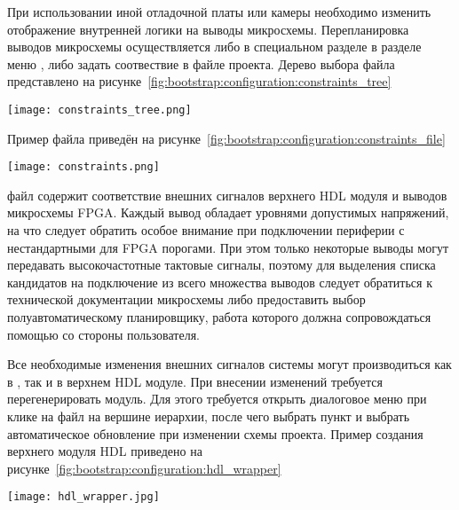 При использовании иной отладочной платы или камеры необходимо изменить отображение внутренней
логики на выводы микросхемы. Перепланировка выводов микросхемы осуществляется либо в специальном
разделе  в разделе меню , либо задать соотвествие в 
файле проекта. Дерево выбора  файла представлено на рисунке~\ref{fig:bootstrap:configuration:constraints_tree}

\begin{center}
  \centering
  \texttt{[image: constraints\_tree.png]}
  \label{fig:bootstrap:configuration:constraints_tree}
\end{center}

Пример  файла приведён на рисунке~\ref{fig:bootstrap:configuration:constraints_file}

\begin{center}
  \centering
  \texttt{[image: constraints.png]}
  \label{fig:bootstrap:configuration:constraints_file}
\end{center}

 файл содержит соответствие внешних сигналов верхнего HDL модуля и
выводов микросхемы FPGA. Каждый вывод обладает уровнями допустимых напряжений, на что
следует обратить особое внимание при подключении периферии с нестандартными для FPGA
порогами. При этом только некоторые выводы могут передавать высокочастотные
тактовые сигналы, поэтому для выделения списка кандидатов на подключение из всего
множества выводов следует обратиться к технической документации микросхемы либо
предоставить выбор полуавтоматическому планировщику, работа которого должна сопровождаться
помощью со стороны пользователя.

Все необходимые изменения внешних сигналов системы могут производиться как в ,
так и в верхнем HDL модуле. При внесении изменений требуется перегенерировать модуль. Для
этого требуется открыть диалоговое меню при клике на файл на вершине иерархии, после чего выбрать пункт
 и выбрать автоматическое обновление при изменении схемы проекта. Пример создания
верхнего модуля HDL приведено на рисунке~\ref{fig:bootstrap:configuration:hdl_wrapper}

\begin{center}
  \centering
  \texttt{[image: hdl\_wrapper.jpg]}
  \label{fig:bootstrap:configuration:hdl_wrapper}
\end{center}

